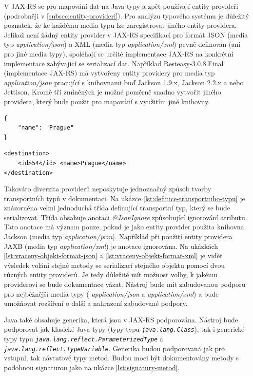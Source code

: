 \documentclass[11pt,twoside,a4paper]{book}
\begin{document}
V JAX-RS se pro mapování dat na Java typy a zpět používají entity provideři (podrobněji v
\ref{subsec:entity-provideri}). Pro analýzu typového systému je důležitý poznatek, že ke každému media
typu lze zaregistrovat jiného entity providera. Jelikož není žádný entity provider v JAX-RS
specifikaci pro formát JSON (media typ {\em application/json}) a XML (media typ
{\em application/xml}) pevně definován (ani pro jiné media typy), spoléhají se
určité implementace JAX-RS na konkrétní implementace zabývající se serializací dat. Například
Resteasy-3.0.8.Final \cite{RESTEasyHome} (implementace JAX-RS) má vytvořeny entity providery
pro media typ {\em application/json} pracující s knihovnami buď Jackson 1.9.x, Jackson 2.2.x a
nebo Jettison. Kromě tří zmíněných je možné poměrně snadno vytvořit jiného providera, který
bude použit pro mapování s využitím jiné knihovny. 

\begin{lstlisting}[frame=single,caption={Vrácený objekt při použití media typu application/json
},label={lst:vraceny-objekt-format-json}]
{
    "name": "Prague"
}
\end{lstlisting}

\begin{lstlisting}[frame=single,caption={Vrácený objekt při použití media typu
application/xml},label={lst:vraceny-objekt-format-xml}] 
<destination>
    <id>54</id> <name>Prague</name>
</destination>
\end{lstlisting}

Takováto diverzita providerů neposkytuje jednoznačný způsob tvorby transportních
typů v dokumentaci. Na ukázce \ref{lst:definice-transportniho-typu} je
znázorněna velmi jednoduchá třída definující transportní typ, který se bude
serializovat. Třída obsahuje anotaci {\em @JsonIgnore} způsobující ignorování
atributu. Tato anotace má význam pouze, pokud je jako entity provider použita
knihovna Jackson (media typ {\em application/json}).
Například při použití entity providera JAXB (media typ {\em application/xml}) je
anotace ignorována. Na ukázkách \ref{lst:vraceny-objekt-format-json} a
\ref{lst:vraceny-objekt-format-xml} je vidět výsledek volání stejné metody se
serializací stejného objektu pomocí dvou různých entity providerů. Je tedy
důležité mít možnost volby, k jakému providerovi se bude dokumentace vázat.
Nástroj bude mít zabudovanou podporu pro nejběžnější media typy ({\em
application/json} a {\em application/xml}) a bude umožňovat rozšíření o další a
nahrazení zabudované podpory.

Java také obsahuje generika, která jsou v JAX-RS podporována. Nástroj bude
podporovat jak klasické Java typy (typy typu {\em \nolinkurl{java.lang.Class}}),
tak i generické typy typu {\em \nolinkurl{java.lang.reflect.ParameterizedType}}
a {\em \nolinkurl{java.lang.reflect.TypeVariable}}. Generika budou podporovaná
jak pro vstupní, tak návratové typy metod. Budou moci být dokumentovány metody s
podobnou signaturou jako na ukázce \ref{lst:signatury-metod}.
\end{document}
